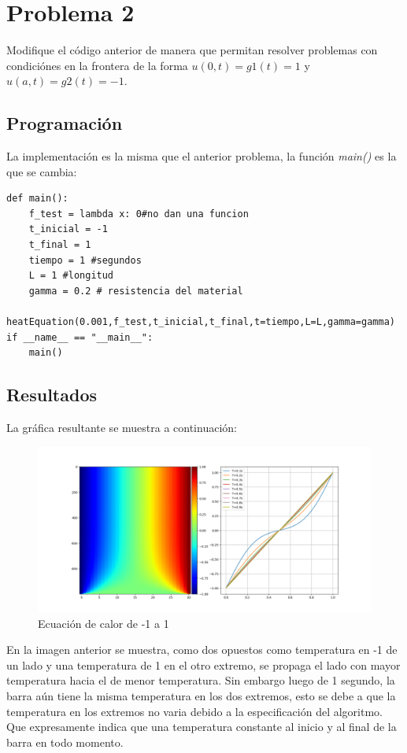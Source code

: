 \documentclass[a4paper,12pt]{article}
\newcommand{\eq}[1]{$#1$}
\begin{document}
    \section{Problema 2}
    Modifique el código anterior de manera que permitan resolver problemas 
    con condiciónes en la frontera de la 
    forma \eq{u(0,t) = g1(t) = 1} y \eq{u(a,t) = g2(t) = -1}.
\newpage
    \subsection{Programación}
    La implementación es la misma que el anterior problema, la función \emph{main()}
    es la que se cambia:
    \begin{lstlisting}[frame=single]
def main():
    f_test = lambda x: 0#no dan una funcion
    t_inicial = -1
    t_final = 1
    tiempo = 1 #segundos
    L = 1 #longitud
    gamma = 0.2 # resistencia del material
    heatEquation(0.001,f_test,t_inicial,t_final,t=tiempo,L=L,gamma=gamma)    
if __name__ == "__main__":
    main()
    \end{lstlisting}

    \subsection{Resultados}
    La gráfica resultante se muestra a continuación:

    \begin{figure}[h]
        \centering
        \includegraphics[width=\textwidth]{ejer2_graph.png}
        \caption{Ecuación de calor de -1 a 1}
    \end{figure}

    En la imagen anterior se muestra, como dos opuestos como temperatura en -1 de un 
    lado y una temperatura de 1 en el otro extremo, se propaga el lado con mayor temperatura
    hacia el de menor temperatura. Sin embargo luego de 1 segundo, la barra aún tiene 
    la misma temperatura en los dos extremos, esto se debe a que la temperatura en los extremos
    no varia debido a la especificación del algoritmo. Que expresamente indica que 
    una temperatura constante al inicio y al final de la barra en todo momento.
    \newpage    
\end{document}
